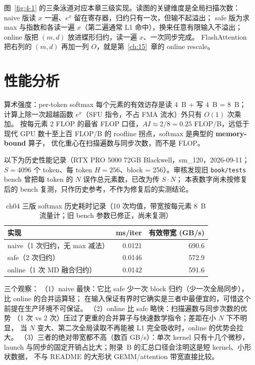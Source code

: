 图~\ref{fig:4-1} 的三条泳道对应本章三级实现。读图的关键维度是全局扫描次数：
naive 版读 $x$ 一遍、$e^x$ 留在寄存器，归约只有一次，但输不起溢出；
safe 版为求 max 与指数和各读一遍 $x$（第二遍通常 L1 命中），换来任意有限输入不溢出；
online 版把 $(m, d)$ 放进蝶形归约，读一遍 $x$、一次同步完成。
FlashAttention 把右列的 $(m,d)$ 再加一列 $O$，就是第~\ref{ch:15}~章的 online rescale。

\section{性能分析}

算术强度：per-token softmax 每个元素的有效访存是读 4~B + 写 4~B = 8~B；
计算上除一次超越函数 $e^{x}$（SFU 指令，不占 FMA 流水）外只有 $O(1)$ 次乘加。
按每元素 2 FLOP 的最省 FLOP 口径，$AI \approx 2/8 = 0.25$ FLOP/B，远低于现代 GPU
数十至上百 FLOP/B 的 roofline 拐点，softmax 是典型的 \textbf{memory-bound} 算子，
优化重心在扫描遍数与同步次数，而不是 FLOP。

以下为历史性能记录（RTX PRO 5000 72GB Blackwell，sm\_120，2026-09-11；
$S = 4096$ 个 token、每 token $H = 256$、block = 256）。审核发现旧
\texttt{book/tests} bench 曾把每 token 的 $N$ 误作总元素数，已改为传 $S\cdot N$；
本表数字尚未按修复后的 bench 复测，只作历史参考，不作为修复后的实测结论。

\begin{table}[htbp]
\centering
\caption{ch04 三版 softmax 历史耗时记录（10 次均值，带宽按每元素 8~B 流量计；旧 bench 参数已修正，尚未复测）}
\label{tab:4-bench}
\begin{tabular}{lrr}
\toprule
实现 & ms/iter & 有效带宽 (GB/s) \\
\midrule
naive（1 次归约，无 max 减法） & 0.0121 & 690.6 \\
safe（2 次归约）              & 0.0146 & 572.9 \\
online（1 次 MD 融合归约）     & 0.0142 & 591.6 \\
\bottomrule
\end{tabular}
\end{table}

三个观察：
（1）naive 最快：它比 safe 少一次 block 归约（少一次全局同步），比 online 的合并运算轻；
在输入保证有界时它确实是三者中最便宜的，可惜这个前提在生产环境不可保证。
（2）online 比 safe 略快：扫描遍数与同步次数的优势
（1 次 vs 2 次）压过了更重的合并算子与快速数学指令；差距在小 $N$ 下不明显，
当 $N$ 变大、第二次全局读取不再能被 L1 完全吸收时，online 的优势会拉大。
（3）三者的绝对带宽都不高（数百 GB/s）：单次 kernel 只有十几个微秒，
launch 与同步的固定开销占比大；附录~B 的汇总口径会注明这是短 kernel、小形状数据，
不与 README 的大形状 GEMM/attention 带宽直接比较。

